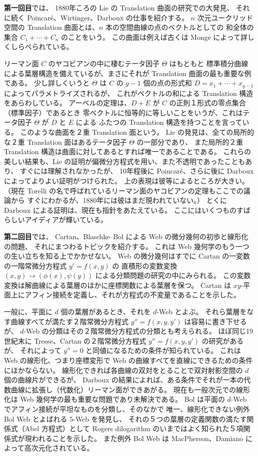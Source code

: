\documentclass[uplatex,dvipdfmx]{jlreq}
\begin{document}
\bigskip

\noindent\textbf{第一回目}では、
1880年ころの Lie の Translation 曲面の研究での大発見、
それに続く Poincaré、Wirtinger、Darboux の仕事を紹介する。
$n$ 次元ユークリッド空間の Translation 曲面とは、$n$ 本の空間曲線の点のベクトルとしての
和全体の集合 $C_1 + \cdots + C_n$ のことをいう。
この曲面は例えば古くは Monge によって詳しくしらべられている。

リーマン面 $C$ のヤコビアンの中に棲むテータ因子 $\Theta$ はもともと
標準積分曲線による葉層構造を備えているが、まさにそれが Translation 曲面の最も重要な例である。
少し詳しくいうと $\Theta$ は $C$ の $g-1$ 個の点の形式和
$D = x_1 + \cdots + x_{g-1}$ によってパラメトライズされるが、
これがベクトルの和による Translation 構造をあらわしている。
アーベルの定理は、$D + E$ が $C$ の正則１形式の零点集合（標準因子）であるとき
零ベクトルに恒等的に等しいことをいうが、これはテータ因子 $\Theta$ が $D$ と $E$ による
ふたつの Translation 構造を持つことを言っている。
このような曲面を２重 Translation 面という。
Lie の発見は、全ての局所的な２重 Translation 面はあるテータ因子 $\Theta$ の一部分であり、
また局所的２重 Translation 構造は曲面に対してあるとすれば唯一であることである。
これらの美しい結果も、Lie の証明が偏微分方程式を用い、また不透明であったこともあり、
すぐには理解されなかったが、
10年程後に Poincaré、さらに後に Darboux によってよりよい証明がつけられた。
上の表現は彼等によるところが大きい。
（現在 Torelli の名で呼ばれているリーマン面のヤコビアンの定理もここでの議論から
すぐにわかるが、1880年には彼はまだ現われていない。）
とくに Darboux による証明は、現在も指針をあたえている。
ここにはいくつものすばらしいアイディアが輝いている。

\bigskip

\noindent\textbf{第二回目}では、
Cartan、Blaschke--Bol による Web の微分幾何の初歩と線形化の問題、
それにまつわるトピックを紹介する。
これは Web 幾何学のもう一つの生い立ちを知る上でかかせない。
Web の微分幾何はすでに Cartan の一変数の一階常微分方程式 $y' = f(x,y)$ の
直積形の変数変換 $(x,y) \to (\phi(x), \psi(y))$ による分類問題の研究の中にみられる。
この変数変換は解曲線による葉層のほかに座標関数による葉層を保つ。
Cartan は $xy$-平面上にアフィン接続を定義し、それが方程式の不変量であることを示した。

一般に、平面に $d$ 個の葉層があるとき、それを $d$-Web とよぶ。
それら葉層をなす曲線すべてが満たす２階常微分方程式 $y'' = f(x,y,y')$ は容易に書き下せるが、
$d$-Web の分類はその２階常微分方程式の分類とも考えられる。
ほぼ同じ19世紀末に Tresse、Cartan の２階常微分方程式 $y'' = f(x,y,y')$ の研究があるが、
それによって $y'' = 0$ と同値になるための条件が知られている。
これは Web の線形化、つまり座標変形で Web の曲線すべてを直線にできるための条件にほかならない。
線形化できれば各曲線の双対をとることで双対射影空間の $d$ 個の曲線片ができるが、
Darboux の結果によれば、ある条件でそれが一本の代数曲線に拡張し（代数化）リーマン面ができあがる。
現在も一般次元での線形化は Web 幾何学の最も重要な問題であり未解決である。
Bol は平面の $d$-Web でアフィン接続が平坦なものを分類し、そのなかで
唯一、線形化できない例外 Bol Web とよばれる $5$-Web を発見し、
それの５つの葉層の定義関数の満たす関係式（Abel 方程式）として
Rogers dilogarithm のいまではよく知られた５項関係式が現われることを示した。
また例外 Bol Web は MacPherson、Damiano によって高次元化されている。
\end{document}
